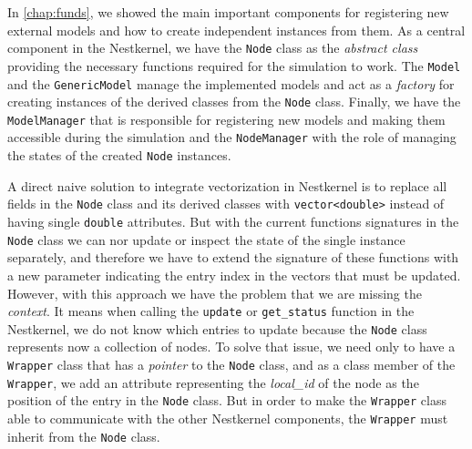 In \autoref{chap:funds}, we showed the main important components for registering new external models and how to create independent instances from them. As a central component in the Nestkernel, we have the \texttt{Node} class as the \emph{abstract class} providing the necessary functions required for the simulation to work. The \texttt{Model} and the \texttt{GenericModel} manage the implemented models and act as a \emph{factory} for creating instances of the derived classes from the \texttt{Node} class. Finally, we have the \texttt{ModelManager} that is responsible for registering new models and making them accessible during the simulation and the \texttt{NodeManager} with the role of managing the states of the created \texttt{Node} instances. 


A direct naive solution to integrate vectorization in Nestkernel is to replace all fields in the \texttt{Node} class and its derived classes with \texttt{vector<double>} instead of having single \texttt{double} attributes. But with the current functions signatures in the \texttt{Node} class we can nor update or inspect the state of the single instance separately, and therefore we have to extend the signature of these functions with a new parameter indicating the entry index in the vectors that must be updated. However, with this approach we have the problem that we are missing the \emph{context}. It means  when calling the \texttt{update} or \texttt{get\_status} function in the Nestkernel, we do not know which entries to update because the \texttt{Node} class represents now a collection of nodes. To solve that issue, we need only to have a \texttt{Wrapper} class that has a \emph{pointer} to the \texttt{Node} class, and as a class member of the \texttt{Wrapper}, we add an attribute representing the \emph{local\_id} of the node as the position of the entry in the \texttt{Node} class. But in order to make the \texttt{Wrapper} class able to communicate with the other Nestkernel components, the \texttt{Wrapper} must inherit from the \texttt{Node} class.


